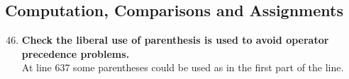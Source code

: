 \documentclass[a4paper,11pt]{report} %
\begin{document}
		\subsection*{Computation, Comparisons and Assignments}\begin{enumerate}[resume]
			\setcounter{enumi}{45}
			\item \textbf{Check the liberal use of parenthesis is used to avoid operator precedence problems.}\smallskip \\
				At line 637 some parentheses could be used as in the first part of the line.
				
		\end{enumerate}
		
\end{document}
